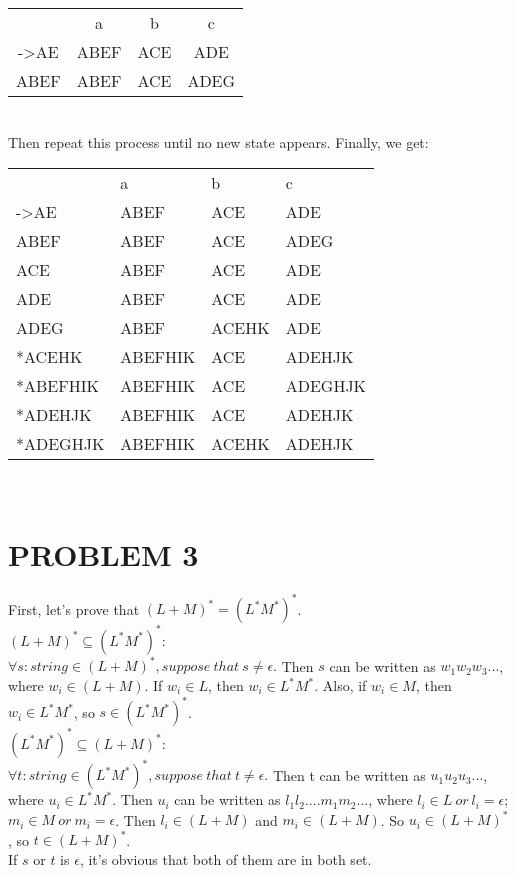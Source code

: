 \documentclass{ctexart}
\begin{document}
\begin{tabular}{cccc}
	     & a    & b   & c    \\
	->AE & ABEF & ACE & ADE  \\
	ABEF & ABEF & ACE & ADEG \\
\end{tabular}\\
Then repeat this process until no new state appears. Finally, we get:\\
\begin{tabular}{llll}
	         & a       & b     & c       \\
	->AE     & ABEF    & ACE   & ADE     \\
	ABEF     & ABEF    & ACE   & ADEG    \\
	ACE      & ABEF    & ACE   & ADE     \\
	ADE      & ABEF    & ACE   & ADE     \\
	ADEG     & ABEF    & ACEHK & ADE     \\
	*ACEHK   & ABEFHIK & ACE   & ADEHJK  \\
	*ABEFHIK & ABEFHIK & ACE   & ADEGHJK \\
	*ADEHJK  & ABEFHIK & ACE   & ADEHJK  \\
	*ADEGHJK & ABEFHIK & ACEHK & ADEHJK  \\
\end{tabular}\\

\section{PROBLEM 3}
First, let's prove that $(L+M)^*=(L^*M^*)^*$.\\

$(L+M)^*\subseteq(L^*M^*)^*$:\\
$\forall s:string \in (L+M)^*, suppose\ that\ s \ne \epsilon.$
Then $s$ can be written as $w_1w_2w_3...$, where $w_i \in (L+M)$.
If $w_i \in L$, then $w_i \in L^*M^*$.
Also, if $w_i \in M$, then $w_i \in L^*M^*$, so $s \in (L^*M^*)^*$.\\
$(L^*M^*)^*\subseteq(L+M)^*$:\\
$\forall t:string \in (L^*M^*)^*, suppose\ that\ t \ne \epsilon.$
Then t can be written as $u_1u_2u_3...$, where $u_i \in L^*M^*$.
Then $u_i$ can be written as $l_1l_2....m_1m_2...$, where $l_i \in L\ or\ l_i=\epsilon$;
$m_i \in M \ or\ m_i=\epsilon$. Then $l_i \in (L+M)$ and $m_i \in (L+M)$.
So $u_i \in (L+M)^*$, so $t \in (L+M)^*$. \\
If $s$ or $t$ is $\epsilon$, it's obvious that both of them are in both set.
\end{document}
